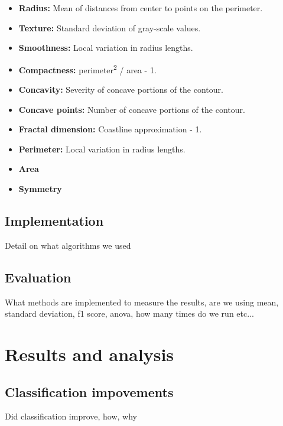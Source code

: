 \documentclass{kththesis}
\begin{document}
\begin{itemize} \itemsep0pt \parskip0pt 
	\item \textbf{Radius:} Mean of distances from center to points on the perimeter.
	\item \textbf{Texture:} Standard deviation of gray-scale values.
	\item \textbf{Smoothness:} Local variation in radius lengths.
  \item \textbf{Compactness:} perimeter\textsuperscript{2} / area - 1.
  \item \textbf{Concavity:} Severity of concave portions of the contour.
  \item \textbf{Concave points:} Number of concave portions of the contour.
  \item \textbf{Fractal dimension:} Coastline approximation - 1.
  \item \textbf{Perimeter:} Local variation in radius lengths.
  \item \textbf{Area}
  \item \textbf{Symmetry}
\end{itemize}




\section{Implementation}

Detail on what algorithms we used

\section{Evaluation}

What methods are implemented to measure the results, are we using mean, standard deviation, f1 score, anova, how many times do we run etc...

\chapter{Results and analysis}

\section{Classification impovements}

Did classification improve, how, why
\end{document}
